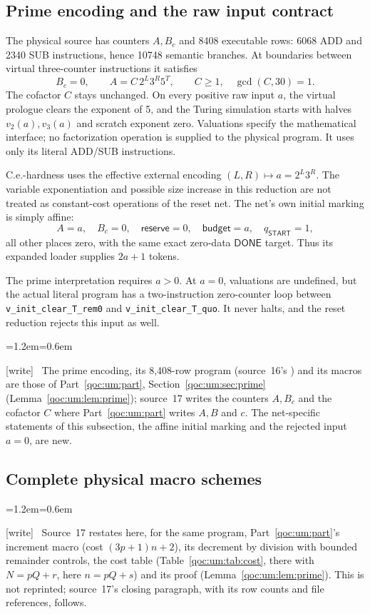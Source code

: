 \documentclass[11pt,letterpaper]{article}
\theoremstyle{definition}
\theoremstyle{remark}
\newcommand{\DONE}{\mathsf{DONE}}
\newcommand{\START}{\mathsf{START}}
\newcommand{\res}{\mathsf{reserve}}
\newcommand{\bud}{\mathsf{budget}}
\newcommand{\rncode}[1]{\texttt{#1}}
\newcommand{\wtag}{\textup{[write]}}
\newenvironment{writenote}{\par\smallskip\begin{list}{}{\leftmargin=1.2em\rightmargin=0.6em}\item[]\small\wtag\ }{\end{list}\smallskip}
\begin{document}
\subsection{Prime encoding and the raw input contract}
The physical source has counters $A,B_c$ and 8408 executable rows: 6068 ADD and 2340 SUB instructions, hence 10748 semantic branches. At boundaries between virtual three-counter instructions it satisfies
\[
 B_c=0,\qquad A=C\,2^L3^R5^T,\qquad C\geq1,\quad\gcd(C,30)=1.
\]
The cofactor $C$ stays unchanged. On every positive raw input $a$, the virtual prologue clears the exponent of 5, and the Turing simulation starts with halves $v_2(a),v_3(a)$ and scratch exponent zero. Valuations specify the mathematical interface; no factorization operation is supplied to the physical program. It uses only its literal ADD/SUB instructions.

C.e.-hardness uses the effective external encoding $(L,R)\mapsto a=2^L3^R$. The variable exponentiation and possible size increase in this reduction are not treated as constant-cost operations of the reset net. The net's own initial marking is simply affine:
\[
 A=a,\quad B_c=0,\quad\res=0,\quad\bud=a,\quad q_{\START}=1,
\]
all other places zero, with the same exact zero-data $\DONE$ target. Thus its expanded loader supplies $2a+1$ tokens.

The prime interpretation requires $a>0$. At $a=0$, valuations are undefined, but the actual literal program has a two-instruction zero-counter loop between \rncode{v\_init\_clear\_T\_rem0} and \rncode{v\_init\_clear\_T\_quo}. It never halts, and the reset reduction rejects this input as well.

\begin{writenote}
The prime encoding, its 8,408-row program (source~16's ) and its macros are those of Part~\ref{qoc:um:part}, Section~\ref{qoc:um:sec:prime} (Lemma~\ref{qoc:um:lem:prime}); source~17 writes the counters $A,B_c$ and the cofactor $C$ where Part~\ref{qoc:um:part} writes $A,B$ and $c$. The net-specific statements of this subsection, the affine initial marking and the rejected input $a=0$, are new.
\end{writenote}


\subsection{Complete physical macro schemes}
\begin{writenote}
Source~17 restates here, for the same program, Part~\ref{qoc:um:part}'s increment macro (cost $(3p+1)n+2$), its decrement by division with bounded remainder controls, the cost table (Table~\ref{qoc:um:tab:cost}, there with $N=pQ+r$, here $n=pQ+s$) and its proof (Lemma~\ref{qoc:um:lem:prime}). This is not reprinted; source~17's closing paragraph, with its row counts and file references, follows.
\end{writenote}
\end{document}
